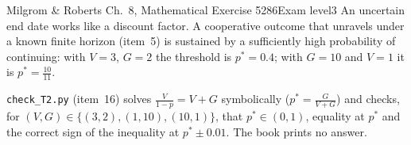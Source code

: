 \begin{exsol}{Milgrom \& Roberts Ch.~8, Mathematical Exercise 5}{286}{Exam level}{3}
\interp An uncertain end date works like a discount factor. A cooperative outcome that unravels under a known
finite horizon (item~5) is sustained by a sufficiently high probability of continuing: with $V = 3$, $G = 2$ the
threshold is $p^* = 0.4$; with $G = 10$ and $V = 1$ it is $p^* = \frac{10}{11}$.

\verify \texttt{check\_T2.py} (item~16) solves $\frac{V}{1-p} = V + G$ symbolically ($p^* = \frac{G}{V+G}$) and
checks, for $(V, G) \in \{(3,2), (1,10), (10,1)\}$, that $p^* \in (0,1)$, equality at $p^*$ and the correct sign of the
inequality at $p^* \pm 0.01$. The book prints no answer.

\end{exsol}
